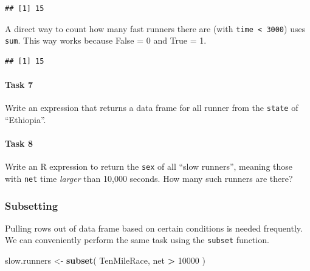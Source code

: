 \documentclass[
]{article}
\newenvironment{Shaded}{\begin{snugshade}}{\end{snugshade}}
\newcommand{\DecValTok}[1]{\textcolor[rgb]{0.00,0.00,0.81}{#1}}
\newcommand{\FunctionTok}[1]{\textcolor[rgb]{0.13,0.29,0.53}{\textbf{#1}}}
\newcommand{\NormalTok}[1]{#1}
\newcommand{\OtherTok}[1]{\textcolor[rgb]{0.56,0.35,0.01}{#1}}
\newcommand{\SpecialCharTok}[1]{\textcolor[rgb]{0.81,0.36,0.00}{\textbf{#1}}}
\begin{document}
\begin{verbatim}
## [1] 15
\end{verbatim}

A direct way to count how many fast runners there are (with
\texttt{time\ \textless{}\ 3000}) uses \texttt{sum}. This way works
because False = 0 and True = 1.

\begin{Shaded}
\end{Shaded}

\begin{verbatim}
## [1] 15
\end{verbatim}

\paragraph{Task 7}\label{task-7}

Write an expression that returns a data frame for all runner from the
\texttt{state} of ``Ethiopia''.

\paragraph{Task 8}\label{task-8}

Write an R expression to return the \texttt{sex} of all ``slow
runners'', meaning those with \texttt{net} time \emph{larger} than
10,000 seconds. How many such runners are there?

\subsubsection{Subsetting}\label{subsetting}

Pulling rows out of data frame based on certain conditions is needed
frequently. We can conveniently perform the same task using the
\texttt{subset} function.

\begin{Shaded}
\begin{Highlighting}[]
\NormalTok{slow.runners }\OtherTok{\textless{}{-}} \FunctionTok{subset}\NormalTok{( TenMileRace, net }\SpecialCharTok{\textgreater{}} \DecValTok{10000}\NormalTok{ )}
\end{Highlighting}
\end{Shaded}
\end{document}
